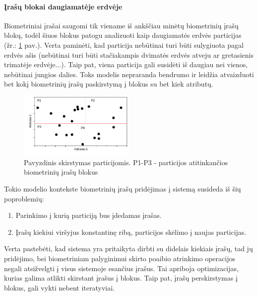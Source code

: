 \paragraph{Įrašų blokai daugiamatėje erdvėje}

Biometriniai įrašai saugomi tik viename iš ankščiau minėtų biometrinių įrašų blokų, todėl šiuos blokus patogu analizuoti kaip daugiamatės erdvės particijas (žr.: \ref{img:multidimensionalPartitionedGallery} pav.).
Verta paminėti, kad particija nebūtinai turi būti sulygiuota pagal erdvės ašis (nebūtinai turi būti stačiakampis dvimatės erdvės atveju ar gretasienis trimatėje erdvėje...).
Taip pat, viena particija gali susidėti iš daugiau nei vienos, nebūtinai jungios dalies.
Toks modelis nepraranda bendrumo ir leidžia atvaizduoti bet kokį biometrinių įrašų paskirstymą į blokus su bet kiek atributų.

\begin{figure}[H]
\begin{center}
\includegraphics[width=0.5\textwidth]{img/MultidimensionalPartitionedGallery.png}
\caption{Pavyzdinis skirstymas particijomis. P1-P3 - particijos atitinkančios biometrinių įrašų blokus}
\label{img:multidimensionalPartitionedGallery}
\end{center}
\end{figure}

Tokio modelio kontekste biometrinių įrašų pridėjimas į sistemą susideda iš šių poproblemių:
\begin{enumerate}
\item Parinkimo į kurią particiją bus įdedamas įrašas.
\item Įrašų kiekiui viršyjus konstantinę ribą, particijos skėlimo į naujas particijas.
\end{enumerate}

Verta pastebėti, kad sistema yra pritaikyta dirbti su didelais kiekiais įrašų, tad jų pridėjimo, bei biometriniam palyginimui skirto poaibio atrinkimo operacijos negali atsižvelgti į visus sistemoje esančius įrašus.
Tai apriboja optimizacijas, kurias galima atlikti skirstant įrašus į blokus.
Taip pat, įrašų perskirstymas į blokus, gali vykti nebent iteratyviai.


